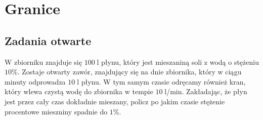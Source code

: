 \setcounter{parc}{0}
\addtocounter{chapc}{1}

\chapter{Granice}

\section{Zadania otwarte}

\zadanie W zbiorniku znajduje się $100\;$l płynu, który jest mieszaniną soli z wodą o stężeniu $10\%$. Zostaje otwarty zawór, znajdujący się na dnie zbiornika, który w ciągu minuty odprowadza $10\;$l płynu. W tym samym czasie odręcamy również kran, który wlewa czystą wodę do zbiornika w tempie {$10\;$l/min.} Zakładając, że płyn jest przez cały czas dokładnie mieszany, policz po jakim czasie stężenie procentowe mieszniny spadnie do $1\%$. %